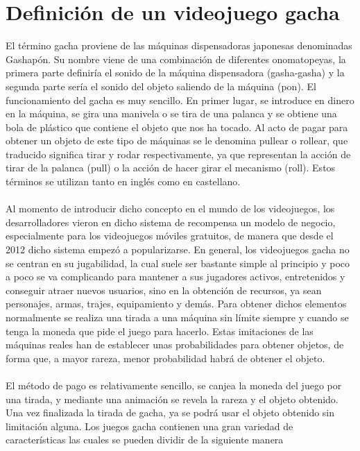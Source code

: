 \documentclass[osajnl,twocolumn,showpacs,superscriptaddress,10pt]{revtex4-2}
\begin{document}
\section{Definición de un videojuego gacha}
El término gacha proviene de las máquinas dispensadoras japonesas denominadas Gashapón. Su nombre viene de una combinación de diferentes onomatopeyas, la primera parte definiría el sonido de la máquina dispensadora (gasha-gasha) y la segunda parte sería el sonido del objeto saliendo de la máquina (pon). El funcionamiento del gacha es muy sencillo. En primer lugar, se introduce en dinero en la máquina, se gira una manivela o se tira de una palanca y se obtiene una bola de plástico que contiene el objeto que nos ha tocado. Al acto de pagar para obtener un objeto de este tipo de máquinas se le denomina pullear o rollear, que traducido significa tirar y rodar respectivamente, ya que representan la acción de tirar de la palanca (pull) o la acción de hacer girar el mecanismo (roll). Estos términos se utilizan tanto en inglés como en castellano.
\\\\
Al momento de introducir dicho concepto en el mundo de los videojuegos, los desarrolladores vieron en dicho sistema de recompensa un modelo de negocio, especialmente para los videojuegos móviles gratuitos, de manera que desde el 2012 dicho sistema empezó a popularizarse. En general, los videojuegos gacha no se centran en su jugabilidad, la cual suele ser bastante simple al principio y poco a poco se va complicando para mantener a sus jugadores activos, entretenidos y conseguir atraer nuevos usuarios, sino en la obtención de recursos, ya sean personajes, armas, trajes, equipamiento y demás. Para obtener dichos elementos normalmente se realiza una tirada a una máquina sin límite siempre y cuando se tenga la moneda que pide el juego para hacerlo. Estas imitaciones de las máquinas reales han de establecer unas probabilidades para obtener objetos, de forma que, a mayor rareza, menor probabilidad habrá de obtener el objeto.\cite{Navarro}
\\\\
El método de pago es relativamente sencillo, se canjea la moneda del juego por una tirada, y mediante una animación se revela la rareza y el objeto obtenido. Una vez finalizada la tirada de gacha, ya se podrá usar el objeto obtenido sin limitación alguna. Los juegos gacha contienen una gran variedad de características las cuales se pueden dividir de la siguiente manera
\end{document}
